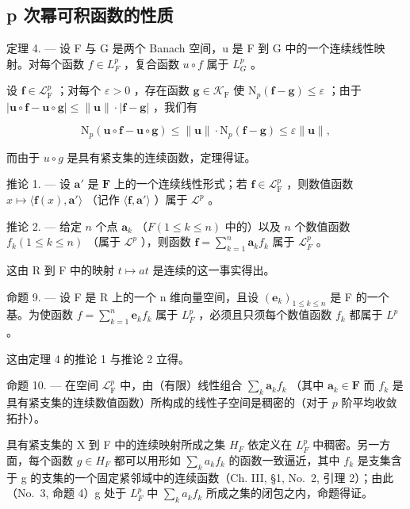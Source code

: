 \subsection{p 次幂可积函数的性质}

定理 4. --- 设 F 与 G 是两个 Banach 空间，u 是 F 到 G 中的一个连续线性映射。对每个函数 \(f \in L_{F}^{p}\) ，复合函数 \(u \circ f\) 属于 \(L_{G}^{p}\) 。

设 \(\mathbf{f} \in \mathcal{L}_{\mathrm{F}}^{p}\) ；对每个 \(\varepsilon > 0\) ，存在函数 \(\mathbf{g} \in \mathcal{K}_{\mathrm{F}}\) 使 \(\mathrm{N}_p(\mathbf{f} - \mathbf{g}) \leqslant \varepsilon\) ；由于 \(|\mathbf{u} \circ \mathbf{f} - \mathbf{u} \circ \mathbf{g}| \leqslant \| \mathbf{u} \| \cdot |\mathbf{f} - \mathbf{g}|\) ，我们有

\[
\mathrm{N} _ {p} (\mathbf {u} \circ \mathbf {f} - \mathbf {u} \circ \mathbf {g}) \leqslant \| \mathbf {u} \| \cdot \mathrm{N} _ {p} (\mathbf {f} - \mathbf {g}) \leqslant \varepsilon \| \mathbf {u} \|,
\]

而由于 \(u \circ g\) 是具有紧支集的连续函数，定理得证。

推论 1. --- 设 \(\mathbf{a}'\) 是 \(\mathbf{F}\) 上的一个连续线性形式；若 \(\mathbf{f} \in \mathcal{L}_{\mathrm{F}}^{p}\) ，则数值函数 \(x \mapsto \langle \mathbf{f}(x), \mathbf{a}' \rangle\) （记作 \(\langle \mathbf{f}, \mathbf{a}' \rangle\) ）属于 \(\mathcal{L}^p\) 。

推论 2. --- 给定 \(n\) 个点 \(\mathbf{a}_k\) （\(F (1 \leqslant k \leqslant n)\) 中的）以及 \(n\) 个数值函数 \(f_k (1 \leqslant k \leqslant n)\) （属于 \(\mathcal{L}^p\) ），则函数 \(\mathbf{f} = \sum_{k=1}^{n} \mathbf{a}_k f_k\) 属于 \(\mathcal{L}_F^p\) 。

这由 R 到 F 中的映射 \(t \mapsto at\) 是连续的这一事实得出。

命题 9. --- 设 F 是 R 上的一个 n 维向量空间，且设 \((\mathbf{e}_{k})_{1\leqslant k\leqslant n}\) 是 F 的一个基。为使函数 \(f=\sum_{k=1}^{n}\mathbf{e}_{k}f_{k}\) 属于 \(L_{F}^{p}\) ，必须且只须每个数值函数 \(f_{k}\) 都属于 \(L^{p}\) 。

这由定理 4 的推论 1 与推论 2 立得。

命题 10. --- 在空间 \(\mathcal{L}_{\mathrm{F}}^{p}\) 中，由（有限）线性组合 \(\sum_{k} \mathbf{a}_{k} f_{k}\) （其中 \(\mathbf{a}_{k} \in \mathbf{F}\) 而 \(f_{k}\) 是具有紧支集的连续数值函数）所构成的线性子空间是稠密的（对于 \(p\) 阶平均收敛拓扑）。

具有紧支集的 X 到 F 中的连续映射所成之集 \(H_{F}\) 依定义在 \(L_{F}^{p}\) 中稠密。另一方面，每个函数 \(g \in H_{F}\) 都可以用形如 \(\sum_{k} a_{k} f_{k}\) 的函数一致逼近，其中 \(f_{k}\) 是支集含于 g 的支集的一个固定紧邻域中的连续函数（Ch. III, §1, No.~2, 引理 2）；由此（No.~3, 命题 4）g 处于 \(L_{F}^{p}\) 中 \(\sum_{k} a_{k} f_{k}\) 所成之集的闭包之内，命题得证。


